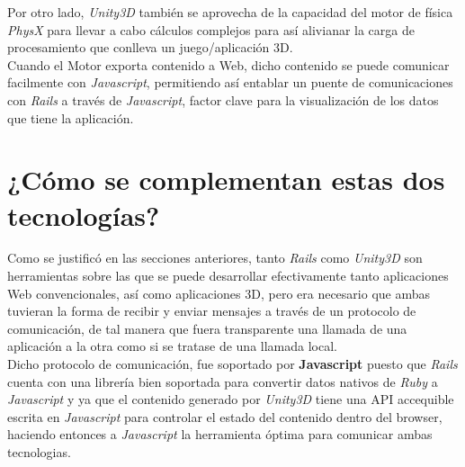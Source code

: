 Por otro lado, \emph{Unity3D} también se aprovecha de la capacidad del motor de física \emph{PhysX} para llevar a cabo cálculos complejos para así alivianar la carga de procesamiento que conlleva un juego/aplicación 3D.\\

Cuando el Motor exporta contenido a Web, dicho contenido se puede comunicar facilmente con \emph{Javascript}, permitiendo así entablar un puente de comunicaciones con \emph{Rails} a través de \emph{Javascript}, factor clave para la visualización de los datos que tiene la aplicación.\\

\section{¿Cómo se complementan estas dos tecnologías?}

Como se justificó en las secciones anteriores, tanto \emph{Rails} como \emph{Unity3D} son herramientas sobre las que se puede desarrollar efectivamente tanto aplicaciones Web convencionales, así como aplicaciones 3D, pero era necesario que ambas tuvieran la forma de recibir y enviar mensajes a través de un protocolo de comunicación, de tal manera que fuera transparente una llamada de una aplicación a la otra como si se tratase de una llamada local.\\

Dicho protocolo de comunicación, fue soportado por \textbf{Javascript} puesto que \emph{Rails} cuenta con una librería bien soportada para convertir datos nativos de \emph{Ruby} a \emph{Javascript} y ya que el contenido generado por \emph{Unity3D} tiene una API accequible escrita en \emph{Javascript} para controlar el estado del contenido dentro del browser, haciendo entonces a \emph{Javascript} la herramienta óptima para comunicar ambas tecnologias.\\

